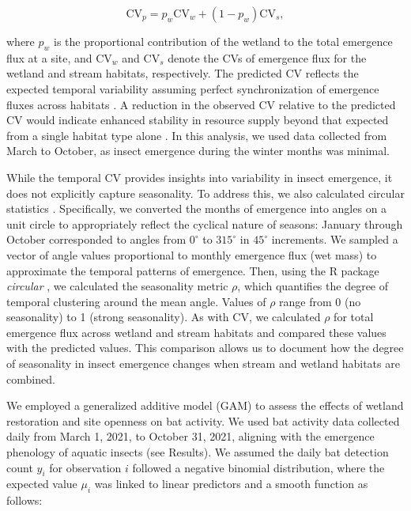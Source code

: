 \documentclass[11pt, class=article, crop=false]{standalone}
\begin{document}
\begin{equation}
    \mbox{CV}_p = p_w \mbox{CV}_w + (1 - p_w) \mbox{CV}_s,
\end{equation}

where $p_w$ is the proportional contribution of the wetland to the total emergence flux at a site, and $\mbox{CV}_w$ and $\mbox{CV}_s$ denote the CVs of emergence flux for the wetland and stream habitats, respectively. 
The predicted CV reflects the expected temporal variability assuming perfect synchronization of emergence fluxes across habitats \citep{thibaut_understanding_2013, moore_lifehistory_2014}.
A reduction in the observed CV relative to the predicted CV would indicate enhanced stability in resource supply beyond that expected from a single habitat type alone \citep{thibaut_understanding_2013, moore_lifehistory_2014}.
In this analysis, we used data collected from March to October, as insect emergence during the winter months was minimal.

While the temporal CV provides insights into variability in insect emergence, it does not explicitly capture seasonality. 
To address this, we also calculated circular statistics \citep{nash_latitudinal_2023, staggemeier_circular_2020}.
Specifically, we converted the months of emergence into angles on a unit circle to appropriately reflect the cyclical nature of seasons: January through October corresponded to angles from $0^\circ$ to $315^\circ$ in $45^\circ$ increments.
We sampled a vector of angle values proportional to monthly emergence flux (wet mass) to approximate the temporal patterns of emergence.
Then, using the R package \textit{circular} \citep{circular}, we calculated the seasonality metric $\rho$, which quantifies the degree of temporal clustering around the mean angle.
Values of $\rho$ range from 0 (no seasonality) to 1 (strong seasonality).
As with CV, we calculated $\rho$ for total emergence flux across wetland and stream habitats and compared these values with the predicted values.
This comparison allows us to document how the degree of seasonality in insect emergence changes when stream and wetland habitats are combined.

We employed a generalized additive model (GAM) to assess the effects of wetland restoration and site openness on bat activity.
We used bat activity data collected daily from March 1, 2021, to October 31, 2021, aligning with the emergence phenology of aquatic insects (see Results).
We assumed the daily bat detection count $y_i$ for observation $i$ followed a negative binomial distribution, where the expected value $\mu_i$ was linked to linear predictors and a smooth function as follows:
\end{document}
